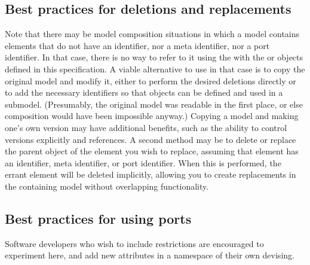 

\subsection{Best practices for deletions and replacements}
\label{best-practices-deletions}
\label{best-practices-replacements}

Note that there may be model composition situations in which a model
contains elements that do not have an identifier, nor a meta identifier,
nor a port identifier.  In that case, there is no way to refer to it
using the with the \Deletion or \ReplacedElement objects defined in this specification.  A viable alternative to use in
that case is to copy the original model and modify it, either to perform
the desired deletions directly or to add the necessary identifiers so
that \Deletion objects can be defined and used in a submodel.
(Presumably, the original model was readable in the first place, or else
composition would have been impossible anyway.)  Copying a model and
making one's own version may have additional benefits, such as the
ability to control versions explicitly and references.  A second method may be to delete or replace the parent object of the element you wish to replace, assuming that element has an identifier, meta identifier, or port identifier.  When this is performed, the errant element will be deleted implicitly, allowing you to create replacements in the containing model without overlapping functionality.



\subsection{Best practices for using ports}
\label{best-practices-ports}

Software developers who wish to include restrictions are encouraged to
experiment here, and add new attributes in a namespace of their own
devising.
